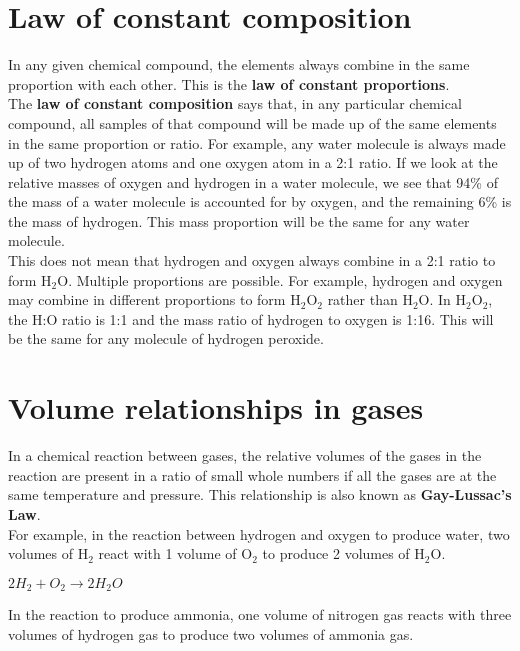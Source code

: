 \section{Law of constant composition}

In any given chemical compound, the elements always combine in the same proportion with each other. This is the \textbf{law of constant proportions}. \\

The \textbf{law of constant composition} says that, in any particular chemical compound, all samples of that compound will be made up of the same elements in the same proportion or ratio. For example, any water molecule is always made up of two hydrogen atoms and one oxygen atom in a 2:1 ratio. If we look at the relative masses of oxygen and hydrogen in a water molecule, we see that 94\% of the mass of a water molecule is accounted for by oxygen, and the remaining 6\% is the mass of hydrogen. This mass proportion will be the same for any water molecule.\\

This does not mean that hydrogen and oxygen always combine in a 2:1 ratio to form H$_{2}$O. Multiple proportions are possible. For example, hydrogen and oxygen may combine in different proportions to form H$_{2}$O$_{2}$ rather than H$_{2}$O. In H$_{2}$O$_{2}$, the H:O ratio is 1:1 and the mass ratio of hydrogen to oxygen is 1:16. This will be the same for any molecule of hydrogen peroxide.\\

\section{Volume relationships in gases}

In a chemical reaction between gases, the relative volumes of the gases in the reaction are present in a ratio of small whole numbers if all the gases are at the same temperature and pressure. This relationship is also known as \textbf{Gay-Lussac's Law}.\\

For example, in the reaction between hydrogen and oxygen to produce water, two volumes of H$_{2}$ react with 1 volume of O$_{2}$ to produce 2 volumes of H$_{2}$O. 

\begin{center}
\rm${2H_{2} + O_{2} \rightarrow 2H_{2}O}$
\end{center}

In the reaction to produce ammonia, one volume of nitrogen gas reacts with three volumes of hydrogen gas to produce two volumes of ammonia gas.

